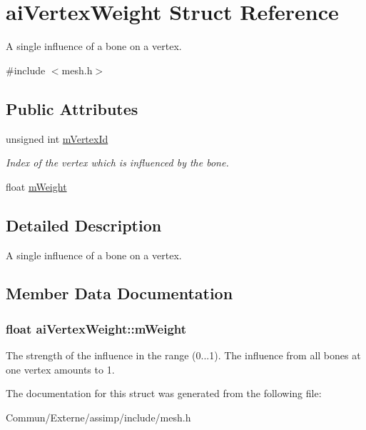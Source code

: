 \hypertarget{structai_vertex_weight}{}\section{ai\+Vertex\+Weight Struct Reference}
\label{structai_vertex_weight}


A single influence of a bone on a vertex.  




{\ttfamily \#include $<$mesh.\+h$>$}

\subsection*{Public Attributes}
\begin{DoxyCompactItemize}
\item 
unsigned int \hyperlink{structai_vertex_weight_af6269cf6a0f02e5ae870a72046d58f4f}{m\+Vertex\+Id}\hypertarget{structai_vertex_weight_af6269cf6a0f02e5ae870a72046d58f4f}{}\label{structai_vertex_weight_af6269cf6a0f02e5ae870a72046d58f4f}

\begin{DoxyCompactList}\small\item\em Index of the vertex which is influenced by the bone. \end{DoxyCompactList}\item 
float \hyperlink{structai_vertex_weight_abab9c49baabc2cafef9ac840f59e61b8}{m\+Weight}
\end{DoxyCompactItemize}


\subsection{Detailed Description}
A single influence of a bone on a vertex. 

\subsection{Member Data Documentation}
\subsubsection[{\texorpdfstring{m\+Weight}{mWeight}}]{\setlength{\rightskip}{0pt plus 5cm}float ai\+Vertex\+Weight\+::m\+Weight}\hypertarget{structai_vertex_weight_abab9c49baabc2cafef9ac840f59e61b8}{}\label{structai_vertex_weight_abab9c49baabc2cafef9ac840f59e61b8}
The strength of the influence in the range (0...1). The influence from all bones at one vertex amounts to 1. 

The documentation for this struct was generated from the following file\+:\begin{DoxyCompactItemize}
\item 
Commun/\+Externe/assimp/include/mesh.\+h\end{DoxyCompactItemize}
